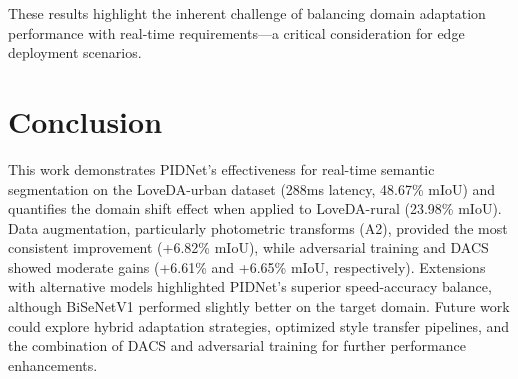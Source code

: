 \documentclass{article}
\begin{document}
\begin{multicols}{2}
		\justifying
		These results highlight the inherent challenge of balancing domain adaptation performance with real-time requirements—a critical consideration for edge deployment scenarios.
		

			\centering
			\label{tab:uda_comparison}

		\section{Conclusion}
		\justifying
		This work demonstrates PIDNet's effectiveness for real-time semantic segmentation on the LoveDA-urban dataset (288ms latency, 48.67\% mIoU) and quantifies the domain shift effect when applied to LoveDA-rural (23.98\% mIoU). Data augmentation, particularly photometric transforms (A2), provided the most consistent improvement (+6.82\% mIoU), while adversarial training and DACS showed moderate gains (+6.61\% and +6.65\% mIoU, respectively). Extensions with alternative models highlighted PIDNet's superior speed-accuracy balance, although BiSeNetV1 performed slightly better on the target domain. Future work could explore hybrid adaptation strategies, optimized style transfer pipelines, and the combination of DACS and adversarial training for further performance enhancements.
		
	\end{multicols}
	
	
	
	
\end{document}
